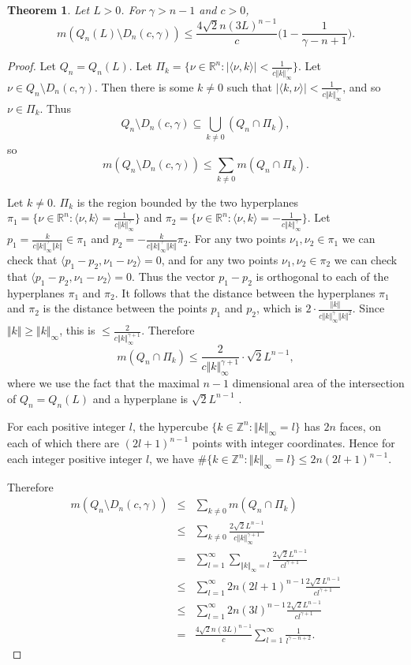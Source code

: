 \documentclass{article}
\newtheorem{theorem}{Theorem}
\newcommand{\norm}[1]{\Vert #1 \Vert}
\begin{document}
\begin{theorem}
\label{thm:biggamma}
Let $L>0$.
For $\gamma>n-1$ and $c>0$,
\[
m(Q_n(L) \setminus D_n(c,\gamma)) \leq \frac{4\sqrt{2}n (3L)^{n-1}}{c} \Big(1-\frac{1}{\gamma-n+1} \Big).
\]
\end{theorem}
\begin{proof}
Let $Q_n=Q_n(L)$.
Let $\Pi_k=\{\nu \in \mathbb{R}^n:|\langle \nu,k\rangle | <
\frac{1}{c\norm{k}_\infty^\gamma}\}$. 
Let $\nu \in Q_n \setminus D_n(c,\gamma)$. Then there is some $k \neq 0$ such that
$|\langle k,\nu \rangle| < \frac{1}{c \norm{k}_\infty^\gamma}$, and so $\nu \in \Pi_k$. Thus
\[
Q_n \setminus D_n(c,\gamma) \subseteq \bigcup_{k \neq 0}
(Q_n \cap \Pi_k),
\]
so
\[
m(Q_n \setminus D_n(c,\gamma)) \leq \sum_{k \neq 0} m(Q_n \cap \Pi_k).
\]

Let $k \neq 0$.
$\Pi_k$ is the region bounded by the two hyperplanes
$\pi_1 = \{\nu \in \mathbb{R}^n: \langle \nu,k \rangle = \frac{1}{c \norm{k}_\infty^\gamma}\}$ and $\pi_2=\{\nu \in \mathbb{R}^n: \langle \nu,k \rangle = -\frac{1}{c \norm{k}_\infty^\gamma}\}$.
Let $p_1=\frac{k}{c \norm{k}_\infty^\gamma \norm{k}} \in \pi_1$
and $p_2=-\frac{k}{c \norm{k}_\infty^\gamma \norm{k}} \pi_2$.
For any two points $\nu_1,\nu_2 \in \pi_1$ we can check that
$\langle p_1-p_2,\nu_1-\nu_2 \rangle =0$, and for any two points $\nu_1,\nu_2 \in \pi_2$
we can check that $\langle p_1-p_2,\nu_1-\nu_2 \rangle =0$. Thus the vector
$p_1-p_2$ is orthogonal to each of the hyperplanes $\pi_1$ and $\pi_2$. It follows
that the distance between the hyperplanes $\pi_1$ and $\pi_2$ is the distance between the points
$p_1$ and $p_2$, which is $2\cdot \frac{\norm{k}}{c\norm{k}_\infty^\gamma \norm{k}^2}$. Since $\norm{k} \geq
\norm{k}_\infty$, this is $\leq \frac{2}{c\norm{k}_\infty^{\gamma+1}}$.
Therefore
\[
m(Q_n \cap \Pi_k) \leq \frac{2}{c\norm{k}_\infty^{\gamma+1}} \cdot \sqrt{2}L^{n-1},
\]
where we use the fact that the maximal $n-1$ dimensional area of the intersection of $Q_n=Q_n(L)$ and a hyperplane is $\sqrt{2}L^{n-1}$ \cite{MR840631}.

For each positive integer $l$, the hypercube $\{k \in \mathbb{Z}^n: 
\norm{k}_\infty =l\}$ has $2n$ faces, on each of which there are $(2l+1)^{n-1}$
points with integer coordinates. Hence for each integer positive integer $l$, we have
$\#\{k \in \mathbb{Z}^n: \norm{k}_\infty = l \} \leq 2n (2l+1)^{n-1}$. 

Therefore
\begin{eqnarray*}
m(Q_n \setminus D_n(c,\gamma))&\leq&\sum_{k \neq 0} m(Q_n \cap \Pi_k)\\
&\leq&\sum_{k \neq 0} \frac{2\sqrt{2}L^{n-1}}{c\norm{k}_\infty^{\gamma+1}}\\
&=&\sum_{l=1}^\infty \sum_{\norm{k}_\infty =l} \frac{2\sqrt{2}L^{n-1}}{cl^{\gamma+1}} \\\
&\leq&\sum_{l=1}^\infty 2n (2l+1)^{n-1} \frac{2\sqrt{2}L^{n-1}}{cl^{\gamma+1}}\\
&\leq&\sum_{l=1}^\infty 2n (3l)^{n-1} \frac{2\sqrt{2}L^{n-1}}{cl^{\gamma+1}}\\
&=&\frac{4\sqrt{2}n (3L)^{n-1}}{c} \sum_{l=1}^\infty \frac{1}{l^{\gamma-n+2}}.
\end{eqnarray*}


\end{proof}
\end{document}
